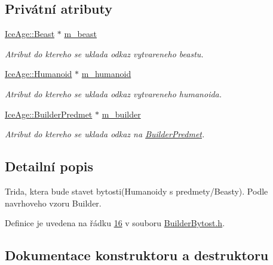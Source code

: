 \subsection*{Privátní atributy}
\begin{DoxyCompactItemize}
\item 
\hyperlink{classIceAge_1_1Beast}{Ice\+Age\+::\+Beast} $\ast$ \hyperlink{classIceAge_1_1BuilderBytost_a220df66c99fac9d382f5d1825f5295de}{m\+\_\+beast}
\begin{DoxyCompactList}\small\item\em Atribut do ktereho se uklada odkaz vytvareneho beastu. \end{DoxyCompactList}\item 
\hyperlink{classIceAge_1_1Humanoid}{Ice\+Age\+::\+Humanoid} $\ast$ \hyperlink{classIceAge_1_1BuilderBytost_a3f4076d50f5bf435c3a90fc123d807a2}{m\+\_\+humanoid}
\begin{DoxyCompactList}\small\item\em Atribut do ktereho se uklada odkaz vytvareneho humanoida. \end{DoxyCompactList}\item 
\hyperlink{classIceAge_1_1BuilderPredmet}{Ice\+Age\+::\+Builder\+Predmet} $\ast$ \hyperlink{classIceAge_1_1BuilderBytost_a39f10b26bcda8142ce353e6ca761cabb}{m\+\_\+builder}
\begin{DoxyCompactList}\small\item\em Atribut do ktereho se uklada odkaz na \hyperlink{classIceAge_1_1BuilderPredmet}{Builder\+Predmet}. \end{DoxyCompactList}\end{DoxyCompactItemize}


\subsection{Detailní popis}
Trida, ktera bude stavet bytosti(Humanoidy s predmety/\+Beasty). Podle navrhoveho vzoru Builder. 

Definice je uvedena na řádku \hyperlink{BuilderBytost_8h_source_l00016}{16} v souboru \hyperlink{BuilderBytost_8h_source}{Builder\+Bytost.\+h}.



\subsection{Dokumentace konstruktoru a destruktoru}
